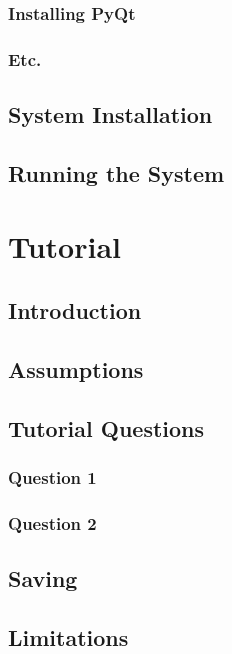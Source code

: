 \subsubsection{Installing PyQt}

\subsubsection{Etc.}

\subsection{System Installation}

\subsection{Running the System}

\section{Tutorial}

\subsection{Introduction}

\subsection{Assumptions}

\subsection{Tutorial Questions}

\subsubsection{Question 1}

\subsubsection{Question 2}

\subsection{Saving}

\subsection{Limitations}

